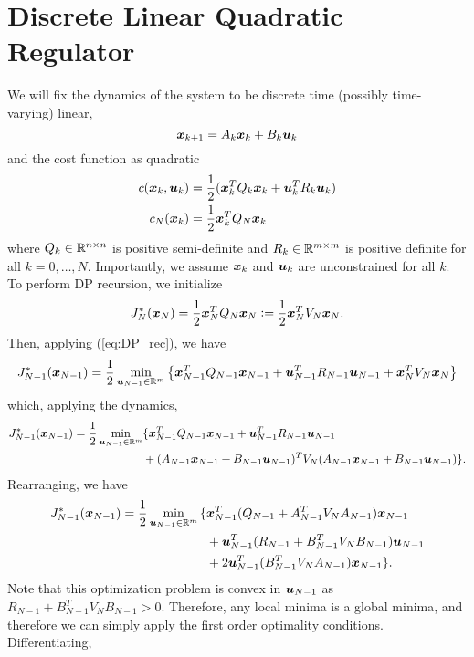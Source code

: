\section{Discrete Linear Quadratic Regulator}
\label{sec:disrete_LQR}
We will fix the dynamics of the system to be discrete time (possibly time-varying) linear, 
\begin{equation}
    \bm{x}_{k+1} = A_k \bm{x}_k + B_k \bm{u}_k
\end{equation}
and the cost function as quadratic
\begin{align}
    c(\bm{x}_k, \bm{u}_k) &= \frac{1}{2} ( \bm{x}_k^T Q_k \bm{x}_k + \bm{u}_k^T R_k \bm{u}_k )\\
    c_N(\bm{x}_k) &= \frac{1}{2} \bm{x}_k^T Q_N \bm{x}_k
\end{align}
where $Q_k \in \mathbb{R}^{n \times n}$ is positive semi-definite and $R_k \in \mathbb{R}^{m \times m}$ is positive definite for all $k = 0, \ldots, N$. Importantly, we assume $\bm{x}_k$ and $\bm{u}_k$ are unconstrained for all $k$. To perform DP recursion, we initialize 
\begin{equation}
    J_N^*(\bm{x}_N) = \frac{1}{2} \bm{x}_N^T Q_N \bm{x}_N \vcentcolon= \frac{1}{2} \bm{x}_N^T V_N \bm{x}_N.
\end{equation}
Then, applying (\ref{eq:DP_rec}), we have
\begin{equation}
    J_{N-1}^*(\bm{x}_{N-1}) = \frac{1}{2} \min_{\bm{u}_{N-1} \in \mathbb{R}^m} \left\{ \bm{x}_{N-1}^T Q_{N-1} \bm{x}_{N-1} + \bm{u}_{N-1}^T R_{N-1} \bm{u}_{N-1} + \bm{x}_N^T V_N \bm{x}_N \right\}
\end{equation}
which, applying the dynamics,
\begin{align}
\label{eq:LQR_rec_cost}
    J_{N-1}^*(\bm{x}_{N-1}) = \frac{1}{2} \min_{\bm{u}_{N-1} \in \mathbb{R}^m} & {\large\{} \bm{x}_{N-1}^T Q_{N-1} \bm{x}_{N-1} + \bm{u}_{N-1}^T R_{N-1} \bm{u}_{N-1}\\
    &+ (A_{N-1} \bm{x}_{N-1} + B_{N-1} \bm{u}_{N-1})^T V_N (A_{N-1} \bm{x}_{N-1} + B_{N-1} \bm{u}_{N-1}) {\large\}}. \nonumber
\end{align}
Rearranging, we have
\begin{align}
    J_{N-1}^*(\bm{x}_{N-1}) = \frac{1}{2} \min_{\bm{u}_{N-1} \in \mathbb{R}^m} {\large\{}
    & \bm{x}_{N-1}^T (Q_{N-1} + A_{N-1}^T V_N A_{N-1}) \bm{x}_{N-1}\\ \nonumber
    & + \bm{u}_{N-1}^T (R_{N-1} + B_{N-1}^T V_N B_{N-1}) \bm{u}_{N-1}\\\nonumber
    & + 2 \bm{u}_{N-1}^T (B_{N-1}^T V_N A_{N-1}) \bm{x}_{N-1} \nonumber
    {\large\}}.
\end{align}
Note that this optimization problem is convex in $\bm{u}_{N-1}$ as $R_{N-1} + B_{N-1}^T V_N B_{N-1} > 0$. Therefore, any local minima is a global minima, and therefore we can simply apply the first order optimality conditions. Differentiating,
